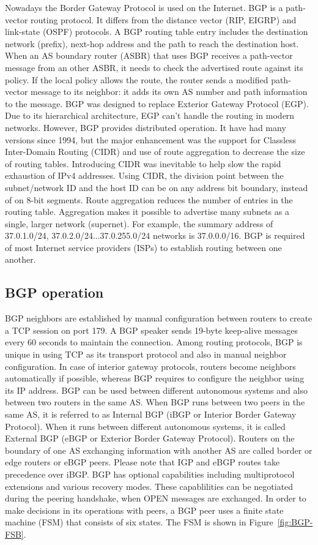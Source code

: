 \documentclass[a4paper]{article}
\begin{document}
Nowadays the Border Gateway Protocol is used on the Internet. BGP is a path-vector routing protocol. It differs from the distance vector (RIP, EIGRP) and link-state (OSPF) protocols. A BGP routing table entry includes the destination network (prefix), next-hop address and the path to reach the destination host. When an AS boundary router (ASBR) that uses BGP receives a path-vector message from an other ASBR, it needs to check the advertised route against its policy. If the local policy allows the route, the router sends a modified path-vector message to its neighbor: it adds its own AS number and path information to the message.
BGP was designed to replace Exterior Gateway Protocol (EGP). Due to its hierarchical architecture, EGP can't handle the routing in modern networks. However, BGP provides distributed operation. It have had many versions since 1994, but the major enhancement was the support for Classless Inter-Domain Routing (CIDR) and use of route aggregation to decrease the size of routing tables. Introducing CIDR was inevitable to help slow the rapid exhaustion of IPv4 addresses. Using CIDR, the division point between the subnet/network ID and the host ID can be on any address bit boundary, instead of on 8-bit segments. Route aggregation reduces the number of entries in the routing table. Aggregation makes it possible to advertise many subnets as a single, larger network (supernet). For example, the summary address of 37.0.1.0/24, 37.0.2.0/24...37.0.255.0/24 networks is 37.0.0.0/16. BGP is required of most Internet service providers (ISPs) to establish routing between one another.


\subsection{BGP operation}

BGP neighbors are established by manual configuration between routers to create a TCP session on port 179. A BGP speaker sends 19-byte keep-alive messages every 60 seconds to maintain the connection. Among routing protocols, BGP is unique in using TCP as its transport protocol and also in manual neighbor configuration. In case of interior gateway protocols, routers become neighbors automatically if possible, whereas BGP requires to configure the neighbor using its IP address. BGP can be used between different autonomous systems and also between two routers in the same AS. When BGP runs between two peers in the same AS, it is referred to as Internal BGP (iBGP or Interior Border Gateway Protocol). When it runs between different autonomous systems, it is called External BGP (eBGP or Exterior Border Gateway Protocol). Routers on the boundary of one AS exchanging information with another AS are called border or edge routers or eBGP peers. Please note that IGP and eBGP routes take precedence over iBGP. BGP has optional capabilities including multiprotocol extensions and various recovery modes. These capablilities can be negotiated during the peering handshake, when OPEN messages are exchanged. In order to make decisions in its operations with peers, a BGP peer uses a finite state machine (FSM) that consists of six states. The FSM is shown in Figure~\ref{fig:BGP-FSB}.
\end{document}
